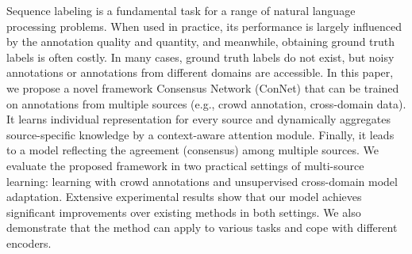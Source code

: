Sequence labeling is a fundamental task for a range of natural language processing problems. When used in practice, its performance is largely influenced by the annotation quality and quantity, and meanwhile, obtaining ground truth labels is often costly. In many cases, ground truth labels do not exist, but noisy annotations or annotations from different domains are accessible. In this paper, we propose a novel framework Consensus Network (ConNet) that can be trained on annotations from multiple sources (e.g., crowd annotation, cross-domain data). It learns individual representation for every source and dynamically aggregates source-specific knowledge by a context-aware attention module. Finally, it leads to a model reflecting the agreement (consensus) among multiple sources. We evaluate the proposed framework in two practical settings of multi-source learning: learning with crowd annotations and unsupervised cross-domain model adaptation. Extensive experimental results show that our model achieves significant improvements over existing methods in both settings. We also demonstrate that the method can apply to various tasks and cope with different encoders.
